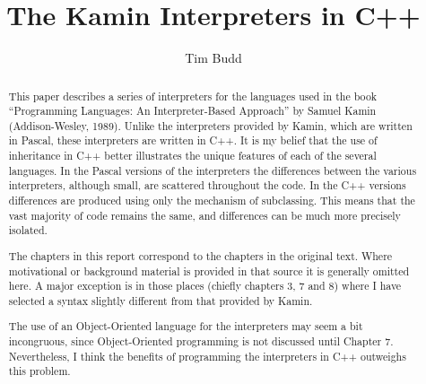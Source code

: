 

\setlength{\textwidth}{7.4in}
\setlength{\oddsidemargin}{1in}
\setlength{\evensidemargin}{1in}
\setlength{\topmargin}{0in}
\title{The Kamin Interpreters in C++}
\author{Tim Budd}
\maketitle
\begin{abstract}
This paper describes a series of interpreters for the languages used in the 
book ``Programming Languages: An Interpreter-Based Approach'' by Samuel 
Kamin (Addison-Wesley, 1989).  Unlike the interpreters provided by Kamin,
which are written in Pascal, 
these interpreters are written in C++.
It is my belief that the use of inheritance in C++ better
illustrates the unique features of each of the several languages.
In the Pascal versions of the interpreters the differences between the
various interpreters, although small, are scattered throughout the code.
In the C++ versions differences are produced using only the mechanism of
subclassing.  This means that the vast majority of code remains the same, 
and differences can be much more precisely isolated.

The chapters in this report correspond to the chapters in the original text.
Where motivational or background material is provided in that source it is
generally omitted here.  A major exception is in those places (chiefly
chapters 3, 7 and 8) where I have selected a syntax slightly different 
from that provided by Kamin.

The use of an Object-Oriented language for the interpreters may seem a bit
incongruous, since Object-Oriented programming is not discussed until
Chapter 7.  Nevertheless, I think the benefits of programming the
interpreters in C++ outweighs this problem.
\end{abstract}











